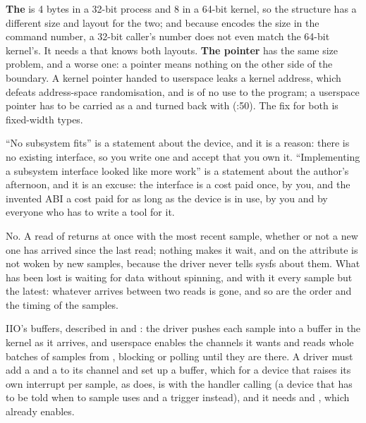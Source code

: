  \textbf{The } is 4 bytes in a 32-bit process and 8 in a 64-bit kernel, so the
structure has a different size and layout for the two; and because  encodes the size in
the command number, a 32-bit caller's number does not even match the 64-bit kernel's. It needs a
 that knows both layouts. \textbf{The pointer} has the same size problem, and a
worse one: a pointer means nothing on the other side of the boundary. A kernel pointer handed to
userspace leaks a kernel address, which defeats address-space randomisation, and is of no use to
the program; a userspace pointer has to be carried as a  and turned back with
 (:50). The fix for both is fixed-width types.

 ``No subsystem fits'' is a statement about the device, and it is a reason: there is no
existing interface, so you write one and accept that you own it. ``Implementing a subsystem
interface looked like more work'' is a statement about the author's afternoon, and it is an excuse:
the interface is a cost paid once, by you, and the invented ABI a cost paid for as long as the
device is in use, by you and by everyone who has to write a tool for it.


 No. A read of  returns at once with the most recent sample, whether
or not a new one has arrived since the last read; nothing makes it wait, and  on the
attribute is not woken by new samples, because the driver never tells sysfs about them. What has
been lost is waiting for data without spinning, and with it every sample but the latest: whatever
arrives between two reads is gone, and so are the order and the timing of the samples.

 IIO's buffers, described in  and
: the driver pushes each sample into a buffer in the kernel as it
arrives, and userspace enables the channels it wants and reads whole batches of samples from
, blocking or polling until they are there. A driver must add a
 and a  to its channel and set up a buffer, which for a device
that raises its own interrupt per sample, as  does, is 
with the handler calling  (a device that has to be told when to sample
uses  and a trigger instead), and it needs
 and , which  already
enables.

